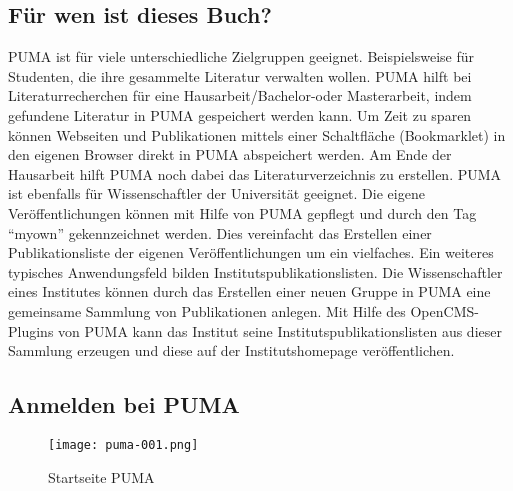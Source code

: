 \subsection{Für wen ist dieses Buch?}
PUMA ist für viele unterschiedliche Zielgruppen geeignet. Beispielsweise für Studenten, die ihre gesammelte Literatur verwalten wollen. PUMA hilft bei Literaturrecherchen für eine Hausarbeit/Bachelor-oder Masterarbeit, indem gefundene Literatur in PUMA gespeichert werden kann. Um Zeit zu sparen können Webseiten und Publikationen mittels einer Schaltfläche (Bookmarklet) in den eigenen Browser direkt in PUMA abspeichert werden. Am Ende der Hausarbeit hilft PUMA noch dabei das Literaturverzeichnis zu erstellen.
\newline 
PUMA ist ebenfalls für Wissenschaftler der Universität geeignet. Die eigene Veröffentlichungen können mit Hilfe von PUMA gepflegt und  durch den Tag \enquote{myown} gekennzeichnet werden. Dies vereinfacht das Erstellen einer Publikationsliste der eigenen Veröffentlichungen um ein vielfaches.
\newline Ein weiteres typisches Anwendungsfeld bilden Institutspublikationslisten. Die Wissenschaftler eines Institutes können durch das Erstellen einer neuen Gruppe in PUMA eine gemeinsame Sammlung von Publikationen anlegen. Mit Hilfe des OpenCMS-Plugins von PUMA kann das Institut seine Institutspublikationslisten aus dieser Sammlung erzeugen und diese auf der Institutshomepage veröffentlichen.

   
\subsection{Anmelden bei PUMA} 
\begin{figure}[ht]
 \centering
 \texttt{[image: puma-001.png]}
 \caption{Startseite PUMA}
 \label{figure1}
\end{figure}

